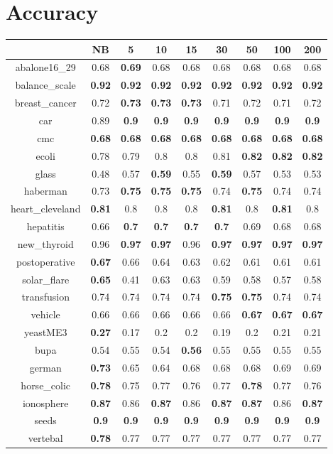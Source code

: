 \documentclass{article}%
\begin{document}
%
\normalsize%
\section*{Accuracy}%
\begin{tabular}{c|cccccccc}%
\hline%
&NB&5&10&15&30&50&100&200\\%
\hline%
abalone16\_29&0.68&\textbf{0.69}&0.68&0.68&0.68&0.68&0.68&0.68\\%
\hline%
balance\_scale&\textbf{0.92}&\textbf{0.92}&\textbf{0.92}&\textbf{0.92}&\textbf{0.92}&\textbf{0.92}&\textbf{0.92}&\textbf{0.92}\\%
\hline%
breast\_cancer&0.72&\textbf{0.73}&\textbf{0.73}&\textbf{0.73}&0.71&0.72&0.71&0.72\\%
\hline%
car&0.89&\textbf{0.9}&\textbf{0.9}&\textbf{0.9}&\textbf{0.9}&\textbf{0.9}&\textbf{0.9}&\textbf{0.9}\\%
\hline%
cmc&\textbf{0.68}&\textbf{0.68}&\textbf{0.68}&\textbf{0.68}&\textbf{0.68}&\textbf{0.68}&\textbf{0.68}&\textbf{0.68}\\%
\hline%
ecoli&0.78&0.79&0.8&0.8&0.81&\textbf{0.82}&\textbf{0.82}&\textbf{0.82}\\%
\hline%
glass&0.48&0.57&\textbf{0.59}&0.55&\textbf{0.59}&0.57&0.53&0.53\\%
\hline%
haberman&0.73&\textbf{0.75}&\textbf{0.75}&\textbf{0.75}&0.74&\textbf{0.75}&0.74&0.74\\%
\hline%
heart\_cleveland&\textbf{0.81}&0.8&0.8&0.8&\textbf{0.81}&0.8&\textbf{0.81}&0.8\\%
\hline%
hepatitis&0.66&\textbf{0.7}&\textbf{0.7}&\textbf{0.7}&\textbf{0.7}&0.69&0.68&0.68\\%
\hline%
new\_thyroid&0.96&\textbf{0.97}&\textbf{0.97}&0.96&\textbf{0.97}&\textbf{0.97}&\textbf{0.97}&\textbf{0.97}\\%
\hline%
postoperative&\textbf{0.67}&0.66&0.64&0.63&0.62&0.61&0.61&0.61\\%
\hline%
solar\_flare&\textbf{0.65}&0.41&0.63&0.63&0.59&0.58&0.57&0.58\\%
\hline%
transfusion&0.74&0.74&0.74&0.74&\textbf{0.75}&\textbf{0.75}&0.74&0.74\\%
\hline%
vehicle&0.66&0.66&0.66&0.66&0.66&\textbf{0.67}&\textbf{0.67}&\textbf{0.67}\\%
\hline%
yeastME3&\textbf{0.27}&0.17&0.2&0.2&0.19&0.2&0.21&0.21\\%
\hline%
bupa&0.54&0.55&0.54&\textbf{0.56}&0.55&0.55&0.55&0.55\\%
\hline%
german&\textbf{0.73}&0.65&0.64&0.68&0.68&0.68&0.69&0.69\\%
\hline%
horse\_colic&\textbf{0.78}&0.75&0.77&0.76&0.77&\textbf{0.78}&0.77&0.76\\%
\hline%
ionosphere&\textbf{0.87}&0.86&\textbf{0.87}&0.86&\textbf{0.87}&\textbf{0.87}&0.86&\textbf{0.87}\\%
\hline%
seeds&\textbf{0.9}&\textbf{0.9}&\textbf{0.9}&\textbf{0.9}&\textbf{0.9}&\textbf{0.9}&\textbf{0.9}&\textbf{0.9}\\%
\hline%
vertebal&\textbf{0.78}&0.77&0.77&0.77&0.77&0.77&0.77&0.77\\%
\hline%
\end{tabular}
\end{document}
